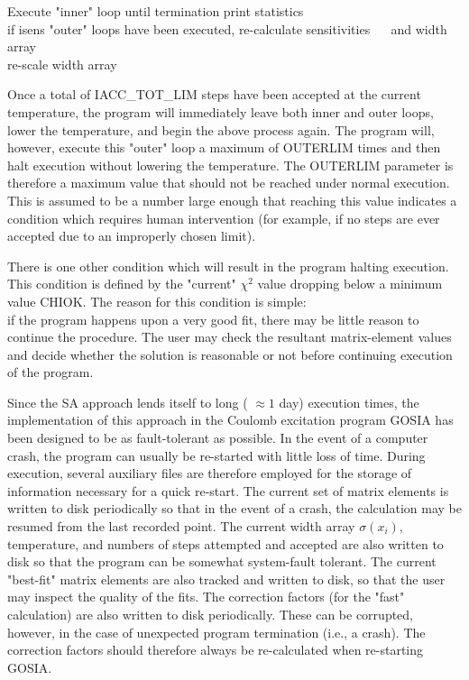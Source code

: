 \documentclass[10pt]{article}
\begin{document}
\begin{displayquote}
Execute "inner" loop until termination print statistics\\
if isens "outer" loops have been executed, re-calculate sensitivities $\quad$ and width array\\
re-scale width array
\end{displayquote}

Once a total of IACC\_TOT\_LIM steps have been accepted at the current temperature, the program will immediately leave both inner and outer loops, lower the temperature, and begin the above process again. The program will, however, execute this "outer" loop a maximum of OUTERLIM times and then halt execution without lowering the temperature. The OUTERLIM parameter is therefore a maximum value that should not be reached under normal execution. This is assumed to be a number large enough that reaching this value indicates a condition which requires human intervention (for example, if no steps are ever accepted due to an improperly chosen limit).

There is one other condition which will result in the program halting execution. This condition is defined by the "current" $\chi^{2}$ value dropping below a minimum value CHIOK. The reason for this condition is simple:\\
if the program happens upon a very good fit, there may be little reason to continue the procedure. The user may check the resultant matrix-element values and decide whether the solution is reasonable or not before continuing execution of the program.

Since the SA approach lends itself to long ( $\approx 1$ day) execution times, the implementation of this approach in the Coulomb excitation program GOSIA has been designed to be as fault-tolerant as possible. In the event of a computer crash, the program can usually be re-started with little loss of time. During execution, several auxiliary files are therefore employed for the storage of information necessary for a quick re-start. The current set of matrix elements is written to disk periodically so that in the event of a crash, the calculation may be resumed from the last recorded point. The current width array $\sigma\left(x_{i}\right)$, temperature, and numbers of steps attempted and accepted are also written to disk so that the program can be somewhat system-fault tolerant. The current "best-fit" matrix elements are also tracked and written to disk, so that the user may inspect the quality of the fits. The correction factors (for the "fast" calculation) are also written to disk periodically. These can be corrupted, however, in the case of unexpected program termination (i.e., a crash). The correction factors should therefore always be re-calculated when re-starting GOSIA.
\end{document}
